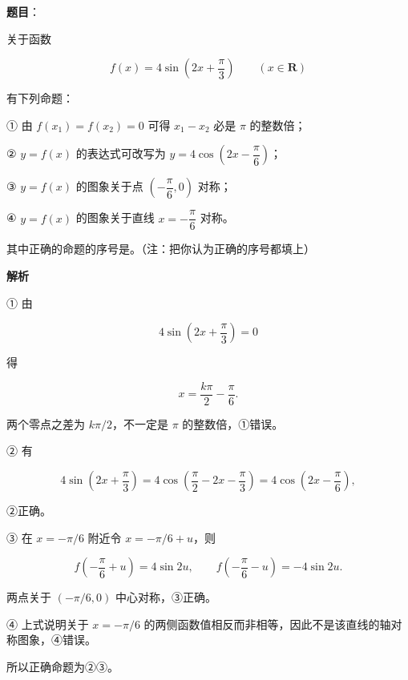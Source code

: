 \begin{answer}

\textbf{题目}：

关于函数

\nopagebreak[4]
\[
f(x)=4\sin\left(2x+\frac\pi3\right)\qquad(x\in\mathbf R)
\]

有下列命题：

① 由 $f(x_1)=f(x_2)=0$ 可得 $x_1-x_2$ 必是 $\pi$ 的整数倍；

② $y=f(x)$ 的表达式可改写为 $y=4\cos\left(2x-\dfrac\pi6\right)$；

③ $y=f(x)$ 的图象关于点 $\left(-\dfrac\pi6,0\right)$ 对称；

④ $y=f(x)$ 的图象关于直线 $x=-\dfrac\pi6$ 对称。

其中正确的命题的序号是\gkblank{}。（注：把你认为正确的序号都填上）

\textbf{解析}

① 由

\nopagebreak[4]
\[
4\sin\left(2x+\frac\pi3\right)=0
\]

得

\nopagebreak[4]
\[
x=\frac{k\pi}{2}-\frac\pi6.
\]

两个零点之差为 $k\pi/2$，不一定是 $\pi$ 的整数倍，①错误。

② 有

\nopagebreak[4]
\[
4\sin\left(2x+\frac\pi3\right)
=4\cos\left(\frac\pi2-2x-\frac\pi3\right)
=4\cos\left(2x-\frac\pi6\right),
\]

②正确。

③ 在 $x=-\pi/6$ 附近令 $x=-\pi/6+u$，则

\nopagebreak[4]
\[
f\left(-\frac\pi6+u\right)=4\sin2u,
\qquad
f\left(-\frac\pi6-u\right)=-4\sin2u.
\]

两点关于 $\left(-\pi/6,0\right)$ 中心对称，③正确。

④ 上式说明关于 $x=-\pi/6$ 的两侧函数值相反而非相等，因此不是该直线的轴对称图象，④错误。

所以正确命题为②③。


\end{answer}
